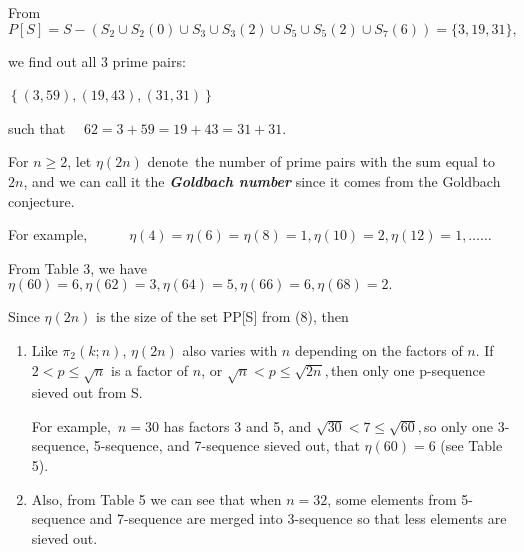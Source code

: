 \documentclass{article}
\begin{document}
\vspace{1\baselineskip}

From 
\[
P[S] = S - \left( S_{2} \cup S_{2}(0) \cup S_{3} \cup S_{3}(2) \cup S_{5} \cup S_{5}(2) \cup S_{7}(6) \right) = \{ 3, 19, 31 \},
\]


\vspace{1\baselineskip}

we find out all 3 prime pairs:

\(\left\{\left(3, 59\right),\left(19, 43\right),\left(31, 31\right)\right\}\) \textit{\ \ \ \ }
\vspace{1\baselineskip}

such that \ \ \( 62 = 3+59 = 19+43 = 31+31\).

\vspace{1\baselineskip}

For \( n\geq 2\), let \( \eta (2n)\) denote the number of prime pairs with the sum equal to \( 2n\),  and we can call it the \textbf{\textit{Goldbach number}} since it comes from the Goldbach conjecture. 

\vspace{1\baselineskip}

For example,\ \ \ \ \ \ \( \eta\left(4\right) = \eta\left(6\right) = \eta\left(8\right) = 1,  \eta\left(10\right) = 2,  \eta\left(12\right) = 1, \ldots \ldots\)
\vspace{1\baselineskip}

From Table 3, we have \( \eta\left(60\right) = 6,  \eta\left(62\right) = 3,  \eta\left(64\right) = 5,  \eta\left(66\right) = 6,  \eta\left(68\right) = 2.\)

\vspace{1\baselineskip}


Since \( \eta (2n)\)\textit{ }is the size of the set PP[S] from (8), then 

\begin{enumerate}
	\item Like \( \pi_{2}\left(k;n\right)\),\textbf{ }\( \eta (2n)\)\textbf{ }also\textbf{ }varies with \( n\) depending on the factors of \( n\).  If \( 2<p\leq\sqrt{n}\) is a factor of \( n\),  or \(\sqrt{n}<p\leq\sqrt{2n} , \)then only one p-sequence sieved out from S.  

\vspace{1\baselineskip}
 For example,\ \( n = 30\) has factors 3 and 5, and \(\sqrt{30}<7\leq\sqrt{60} , \)so only one 3-sequence, 5-sequence, and 7-sequence sieved out, that \( \eta\left(60\right) = 6\) (see Table 5).  
 
\vspace{1\baselineskip}

	\item Also, from Table 5 we can see that when \( n = 32\), some elements from 5-sequence and 7-sequence are merged into 3-sequence so that less elements are sieved out.

\end{enumerate}
\end{document}
